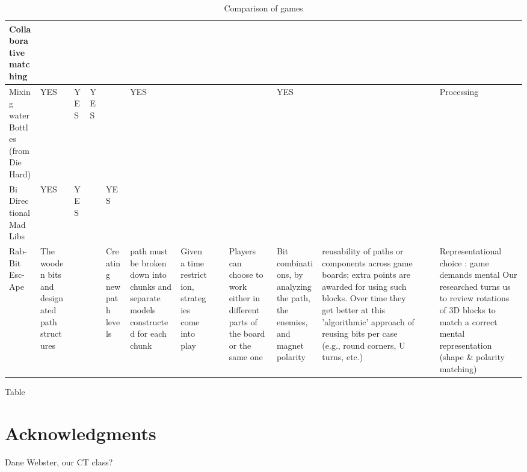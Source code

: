 \documentclass{acm_proc_article-sp}
\begin{document}
\begin{sidewaystable}[htbp]
\begin{tabular}{|p{1.3cm}||p{1cm}|p{2cm}|p{2cm}|p{1.6cm}|p{2cm}|p{1cm}|p{2cm}|p{1cm}|p{1.3cm}|p{2.7cm}|p{1cm}|p{1.6cm}|}
    Collaborative matching & ~ & ~ & ~ & ~ & ~ & ~ & ~ & ~ & ~ & ~ & ~ & ~ \\ \hline
    
    Mixing water Bottles (from Die Hard\cite{diehard2008thorp}) & \cellcolor{blue!25}YES & \cellcolor{blue!25}YES & \cellcolor{blue!25}YES & ~ & \cellcolor{blue!25}YES & ~ & ~ & ~ & \cellcolor{blue!25}YES & ~ & ~ & Processing \\ \hline
    
    Bi Directional Mad Libs & \cellcolor{blue!25}YES & \cellcolor{blue!25}YES & ~ & \cellcolor{blue!25}YES & ~ & ~ & ~ & ~ & ~ & ~ & ~ & ~ \\ \hline
    
    Rab-Bit Esc-Ape & The wooden bits and designated path structures & ~ & ~ & Creating new path levels & path must be broken down into chunks and separate models constructed for each chunk & Given a time restriction, strategies come into play & ~ & Players can choose to work either in different parts of the board or the same one & Bit combinations, by analyzing the path, the enemies, and magnet polarity & reusability of paths or components across game boards; extra points are awarded for using such blocks. Over time they get better at this 'algorithmic' approach of reusing bits per case (e.g., round corners, U turns, etc.) & ~ & Representational choice : game demands mental
    Our researched turns us to review  rotations of 3D blocks to match a correct mental representation (shape \& polarity matching) \\ \hline
    \end{tabular}\hspace*{-1cm}\vspace*{-1cm}
    \caption{Comparison of games}
    Table \label{table:games-comparison}
\end{sidewaystable}

\clearpage
\section{Acknowledgments}
Dane Webster, our CT class?
\end{document}
